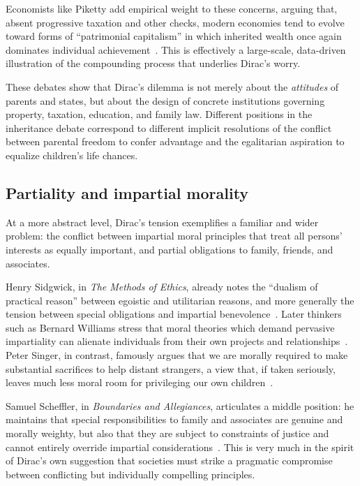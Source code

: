 \documentclass[%
  reprint,
  superscriptaddress,
  amsmath,amssymb,
  pra,
  floatfix,
  longbibliography
]{revtex4-2}
\begin{document}
Economists like Piketty add empirical weight to these concerns,
arguing that, absent progressive taxation and other checks, modern
economies tend to evolve toward forms of ``patrimonial capitalism'' in
which inherited wealth once again dominates individual
achievement~\cite{Piketty2014}.  This is effectively a large-scale,
data-driven illustration of the compounding process that underlies
Dirac's worry.

These debates show that Dirac's dilemma is not merely about the
\emph{attitudes} of parents and states, but about the design of concrete
institutions governing property, taxation, education, and family law.
Different positions in the inheritance debate correspond to different
implicit resolutions of the conflict between parental freedom to confer
advantage and the egalitarian aspiration to equalize children's life
chances.

\subsection{Partiality and impartial morality}

At a more abstract level, Dirac's tension exemplifies a familiar and
wider problem: the conflict between impartial moral principles that
treat all persons' interests as equally important, and partial
obligations to family, friends, and associates.

Henry Sidgwick, in \emph{The Methods of Ethics}, already notes the
``dualism of practical reason'' between egoistic and utilitarian
reasons, and more generally the tension between special obligations and
impartial benevolence~\cite{Sidgwick1907}.  Later thinkers such as
Bernard Williams stress that moral theories which demand pervasive
impartiality can alienate individuals from their own projects and
relationships~\cite{Williams1981}.  Peter Singer, in contrast,
famously argues that we are morally required to make substantial
sacrifices to help distant strangers, a view that, if taken seriously,
leaves much less moral room for privileging our own
children~\cite{Singer1972}.

Samuel Scheffler, in \emph{Boundaries and Allegiances}, articulates a
middle position: he maintains that special responsibilities to family
and associates are genuine and morally weighty, but also that they are
subject to constraints of justice and cannot entirely override
impartial considerations~\cite{Scheffler2001}.  This is very much in
the spirit of Dirac's own suggestion that societies must strike a
pragmatic compromise between conflicting but individually compelling
principles.
\end{document}
